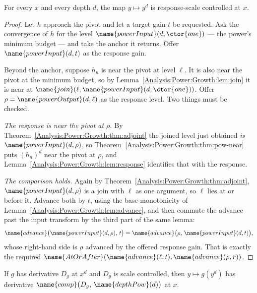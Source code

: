 \begin{theorem}
\label{Analysis:Power:Growth:thm:main}
For every $x$ and every depth $d$, the map $y \mapsto y^{d}$ is response-scale
controlled at $x$.
\end{theorem}

\begin{proof}
Let $h$ approach the pivot and let a target gain $t$ be requested.  Ask the
convergence of $h$ for the level $\name{powerInput}(d,\ctor{one})$ --- the
power's minimum budget --- and take the anchor it returns.  Offer
$\name{powerInput}(d,t)$ as the response gain.

Beyond the anchor, suppose $h_n$ is near the pivot at level $\ell$.  It is also
near the pivot at the minimum budget, so by
Lemma~\ref{Analysis:Power:Growth:lem:join} it is near at
$\name{join}(\ell, \name{powerInput}(d,\ctor{one}))$.  Offer
$\rho = \name{powerOutput}(d,\ell)$ as the response level.  Two things must be
checked.

\emph{The response is near the pivot at $\rho$.}  By
Theorem~\ref{Analysis:Power:Growth:thm:adjoint} the joined level just obtained
\emph{is} $\name{powerInput}(d,\rho)$, so
Theorem~\ref{Analysis:Power:Growth:thm:pow-near} puts $(h_n)^{d}$ near the
pivot at $\rho$, and Lemma~\ref{Analysis:Power:Growth:lem:response} identifies
that with the response.

\emph{The comparison holds.}  Again by
Theorem~\ref{Analysis:Power:Growth:thm:adjoint},
$\name{powerInput}(d,\rho)$ is a join with $\ell$ as one argument, so $\ell$
lies at or before it.  Advance both by $t$, using the base-monotonicity of
Lemma~\ref{Analysis:Power:Growth:lem:advance}, and then commute the advance
past the input transform by the third part of the same lemma:
\[
  \name{advance}\bigl(\name{powerInput}(d,\rho),\, t\bigr)
  = \name{advance}\bigl(\rho,\, \name{powerInput}(d,t)\bigr),
\]
whose right-hand side is $\rho$ advanced by the offered response gain.  That
is exactly the required
$\name{AtOrAfter}(\name{advance}(\ell,t), \name{advance}(\rho, r))$.
\end{proof}

\begin{corollary}
\label{Analysis:Power:Growth:cor:chain}
If $g$ has derivative $D_g$ at $x^{d}$ and $D_g$ is scale controlled, then
$y \mapsto g(y^{d})$ has derivative
$\name{comp}\bigl(D_g,\, \name{depthPow}(d)\bigr)$ at $x$.
\end{corollary}

